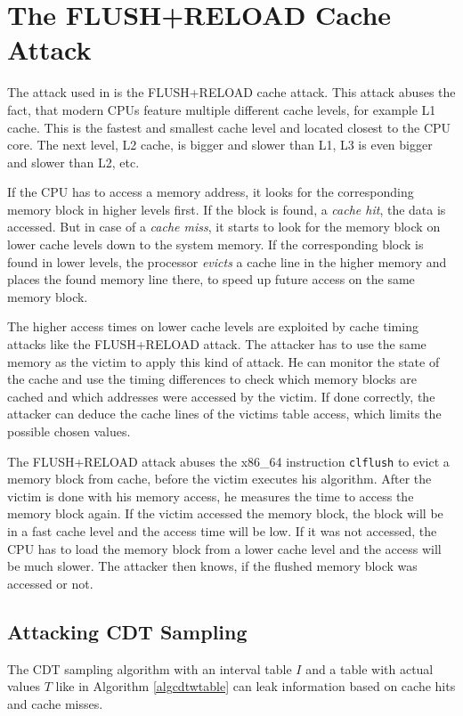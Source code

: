 \section{The FLUSH+RELOAD Cache Attack}
The attack used in \cite{cryptoeprint:2016:300} is the FLUSH+RELOAD cache attack. This attack abuses the fact, that modern CPUs feature multiple different cache levels, for example L1 cache. This is the fastest and smallest cache level and located closest to the CPU core. The next level, L2 cache, is bigger and slower than L1, L3 is even bigger and slower than L2, etc.

If the CPU has to access a memory address, it looks for the corresponding memory block in higher levels first. If the block is found, a \textit{cache hit}, the data is accessed. But in case of a \textit{cache miss}, it starts to look for the memory block on lower cache levels down to the system memory. If the corresponding block is found in lower levels, the processor \textit{evicts} a cache line in the higher memory and places the found memory line there, to speed up future access on the same memory block.

The higher access times on lower cache levels are exploited by cache timing attacks like the FLUSH+RELOAD attack. The attacker has to use the same memory as the victim to apply this kind of attack. He can monitor the state of the cache and use the timing differences to check which memory blocks are cached and which addresses were accessed by the victim. If done correctly, the attacker can deduce the cache lines of the victims table access, which limits the possible chosen values.


The FLUSH+RELOAD attack abuses the x86\_64 instruction \verb|clflush| to evict a memory block from cache, before the victim executes his algorithm. After the victim is done with his memory access, he measures the time to access the memory block again. If the victim accessed the memory block, the block will be in a fast cache level and the access time will be low. If it was not accessed, the CPU has to load the memory block from a lower cache level and the access will be much slower. The attacker then knows, if the flushed memory block was accessed or not.

\subsection{Attacking CDT Sampling}
The CDT sampling algorithm with an interval table $I$ and a table with actual values $T$ like in Algorithm \ref{algcdtwtable} can leak information based on cache hits and cache misses.

